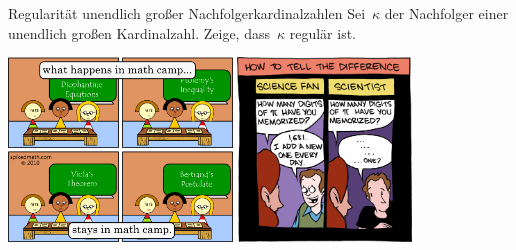\documentclass{uebblatt}
\begin{document}
\begin{aufgabe}{Regularität unendlich großer Nachfolgerkardinalzahlen}
Sei~$\kappa$ der Nachfolger einer unendlich großen Kardinalzahl.
Zeige, dass~$\kappa$ regulär ist.
\end{aufgabe}

\vfill
\centering
\href{http://spikedmath.com/182.html}{\includegraphics[height=4.9cm]{images/what-happens-in-math-camp}}
\quad
\href{http://smbc-comics.com/index.php?id=1777}{\includegraphics[height=4.9cm]{images/memorizing-pi}}
\par
\end{document}
